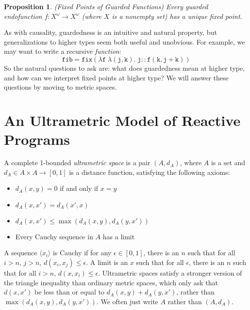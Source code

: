 \documentclass[nocopyrightspace,preprint]{sigplanconf}
\newcommand{\term}[1]{\ensuremath{\mathtt{{#1}}}}
\newtheorem{prop}{Proposition}
\begin{document}
\begin{prop}{(Fixed Points of Guarded Functions)}
Every guarded endofunction $f : X^\omega \to X^\omega$ (where $X$ is a
nonempty set) has a unique fixed point.
\end{prop}

As with causality, guardedness is an intuitive and natural property,
but generalizations to higher types seem both useful and unobvious. For
example, we may want to write a recursive \emph{function}:
\begin{displaymath}
\term{fib = fix(\lambda f\; \lambda (j,k).\; j :: f(k,j+k))}
\end{displaymath}
So the natural questions to ask are: what does guardedness mean at
higher type, and how can we interpret fixed points at higher type?
We will answer these questions by moving to metric spaces.

\section{An Ultrametric Model of Reactive Programs}


A complete 1-bounded \emph{ultrametric space} is a pair $(A, d_A)$,
where $A$ is a set and $d_A \in A \times A \to [0,1]$ is a distance
function, satisfying the following axioms:
\begin{itemize}
\item $d_A(x, y) = 0$ if and only if $x = y$
\item $d_A(x, x') = d_A(x', x)$
\item $d_A(x, x') \leq \max(d_A(x, y), d_A(y, x'))$
\item Every Cauchy sequence in $A$ has a limit
\end{itemize}
A sequence $\langle x_i\rangle$ is Cauchy if for any $\epsilon\in[0,1]$, there is an $n$ such that for all $i>n$, $j>n$, $d(x_i,x_j)\leq \epsilon$. A limit is an $x$ such that for all $\epsilon$, there is an $n$ such that for all $i>n$, $d(x,x_i)\leq \epsilon$. 
Ultrametric spaces satisfy a stronger version of the triangle inequality than
ordinary metric spaces, which only ask that
$d(x,x')$ be less than or equal to $d_A(x, y) + d_A(y, x')$,
rather than $\max(d_A(x, y), d_A(y, x'))$.
We often just write $A$ rather than $(A, d_A)$. 
\end{document}
